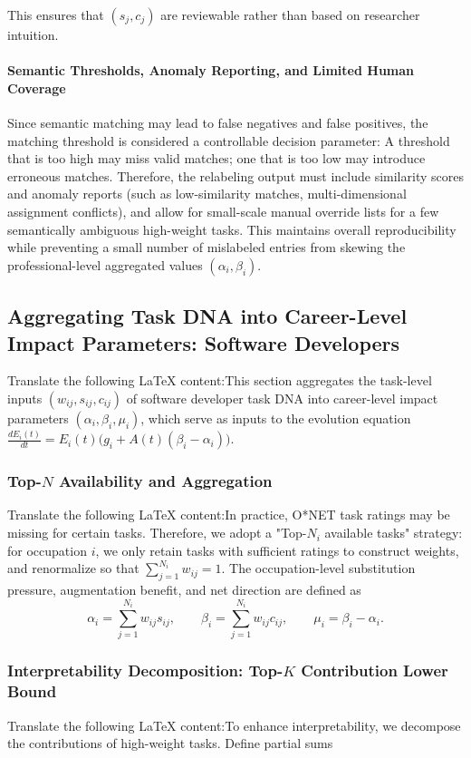 This ensures that $(s_j,c_j)$ are reviewable rather than based on researcher intuition.\paragraph{Semantic Thresholds, Anomaly Reporting, and Limited Human Coverage}Since semantic matching may lead to false negatives and false positives, the matching threshold is considered a controllable decision parameter:
A threshold that is too high may miss valid matches; one that is too low may introduce erroneous matches.
Therefore, the relabeling output must include similarity scores and anomaly reports (such as low-similarity matches, multi-dimensional assignment conflicts), and allow for small-scale manual override lists for a few semantically ambiguous high-weight tasks.
This maintains overall reproducibility while preventing a small number of mislabeled entries from skewing the professional-level aggregated values $(\alpha_i,\beta_i)$.\subsection{Aggregating Task DNA into Career-Level Impact Parameters: Software Developers}Translate the following LaTeX content:This section aggregates the task-level inputs $(w_{ij}, s_{ij}, c_{ij})$ of software developer task DNA into career-level impact parameters $(\alpha_i,\beta_i,\mu_i)$,
which serve as inputs to the evolution equation $\frac{dE_i(t)}{dt}=E_i(t)\big(g_i + A(t)(\beta_i-\alpha_i)\big)$.\subsubsection{Top-$N$ Availability and Aggregation}Translate the following LaTeX content:In practice, O*NET task ratings may be missing for certain tasks.  
Therefore, we adopt a "Top-$N_i$ available tasks" strategy: for occupation $i$, we only retain tasks with sufficient ratings to construct weights, and renormalize so that $\sum_{j=1}^{N_i} w_{ij}=1$.  
The occupation-level substitution pressure, augmentation benefit, and net direction are defined as  
\begin{equation}
    \alpha_i=\sum_{j=1}^{N_i} w_{ij} s_{ij},\qquad
    \beta_i=\sum_{j=1}^{N_i} w_{ij} c_{ij},\qquad
    \mu_i=\beta_i-\alpha_i.
\end{equation}\subsubsection{Interpretability Decomposition: Top-$K$ Contribution Lower Bound}Translate the following LaTeX content:To enhance interpretability, we decompose the contributions of high-weight tasks. Define partial sums
